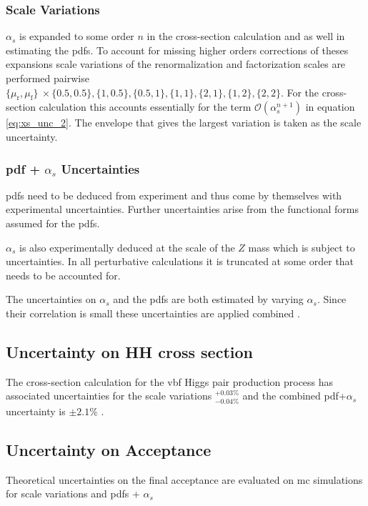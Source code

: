 \subsubsection*{Scale Variations}
$\alpha_s$ is expanded to some order $n$ in the cross-section calculation and as well in estimating the \acp{pdf}. To account for missing higher orders corrections of theses expansions scale variations of the renormalization and factorization scales are performed pairwise $\{\mu_\text{r},\mu_\text{f}\}\ \times \{0.5,0.5\}, \{1,0.5\}, \{0.5,1\}, \{1,1\}, \{2,1\}, \{1,2\}, \{2,2\}$. For the cross-section calculation this accounts essentially for the term $\mathcal{O}(\alpha_s^{n+1})$ in equation \ref{eq:xs_unc_2}. The envelope that gives the largest variation is taken as the scale uncertainty.

\subsubsection*{\ac{pdf} + $\alpha_s$ Uncertainties}
\acp{pdf} need to be deduced from experiment and thus come by themselves with experimental uncertainties. Further uncertainties arise from the functional forms assumed for the \acp{pdf}.

$\alpha_s$ is also experimentally deduced at the scale of the $Z$ mass which is subject to uncertainties. In all perturbative calculations it is truncated at some order that needs to be accounted for.

The uncertainties on $\alpha_s$ and the \acp{pdf} are both estimated by varying $\alpha_s$. Since  their correlation is small these uncertainties are applied combined \citep{unc_recipe}.

\subsection{Uncertainty on HH cross section}
The cross-section calculation for the \ac{vbf} Higgs pair production process has associated uncertainties for the scale variations $^{+0.03\%}_{-0.04\%}$ and the combined \ac{pdf}+$\alpha_s$ uncertainty is $\pm 2.1\%$ \citep{de2016arxiv}.

\subsection{Uncertainty on Acceptance}
Theoretical uncertainties on the final acceptance are evaluated on \ac{mc} simulations for scale variations and \acp{pdf} + $\alpha_s$ 

